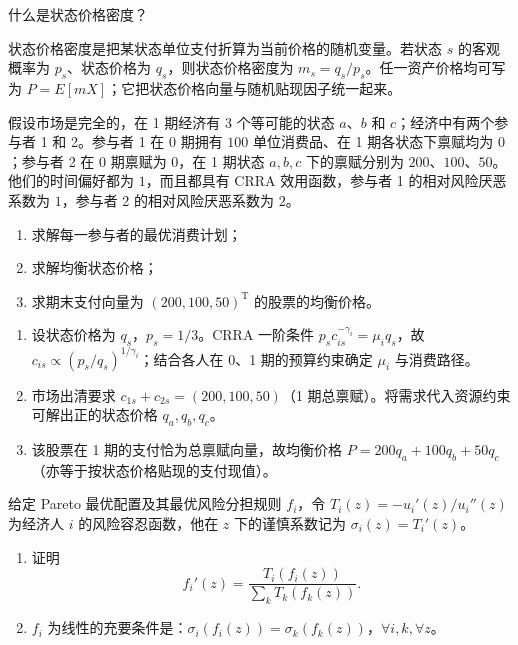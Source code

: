\begin{problem}
 什么是状态价格密度？
\end{problem}
\begin{solution}
状态价格密度是把某状态单位支付折算为当前价格的随机变量。若状态 $s$ 的客观概率为 $p_s$、状态价格为 $q_s$，则状态价格密度为 $m_s=q_s/p_s$。任一资产价格均可写为 $P=E[mX]$；它把状态价格向量与随机贴现因子统一起来。
\end{solution}
\begin{problem}
 假设市场是完全的，在 1 期经济有 $3$ 个等可能的状态 $a$、$b$ 和 $c$；经济中有两个参与者 1 和 2。参与者 1 在 0 期拥有 $100$ 单位消费品、在 1 期各状态下禀赋均为 $0$；参与者 2 在 0 期禀赋为 $0$，在 1 期状态 $a,b,c$ 下的禀赋分别为 $200$、$100$、$50$。他们的时间偏好都为 $1$，而且都具有 CRRA 效用函数，参与者 1 的相对风险厌恶系数为 $1$，参与者 2 的相对风险厌恶系数为 $2$。
\begin{enumerate}[label=(\alph*)]
    \item 求解每一参与者的最优消费计划；
    \item 求解均衡状态价格；
    \item 求期末支付向量为 $(200,100,50)^{\mathrm{T}}$ 的股票的均衡价格。
\end{enumerate}
\end{problem}
\begin{solution}
\begin{enumerate}[label=(\alph*)]
\item 设状态价格为 $q_s$，$p_s=1/3$。CRRA 一阶条件 $p_s c_{is}^{-\gamma_i}=\mu_i q_s$，故 $c_{is}\propto (p_s/q_s)^{1/\gamma_i}$；结合各人在 0、1 期的预算约束确定 $\mu_i$ 与消费路径。
\item 市场出清要求 $c_{1s}+c_{2s}=(200,100,50)$（1 期总禀赋）。将需求代入资源约束可解出正的状态价格 $q_a,q_b,q_c$。
\item 该股票在 1 期的支付恰为总禀赋向量，故均衡价格 $P=200q_a+100q_b+50q_c$（亦等于按状态价格贴现的支付现值）。
\end{enumerate}
\end{solution}
\begin{problem}
 给定 Pareto 最优配置及其最优风险分担规则 $f_i$，令 $T_i(z)=-u_i'(z)/u_i''(z)$ 为经济人 $i$ 的风险容忍函数，他在 $z$ 下的谨慎系数记为 $\sigma_i(z)=T_i'(z)$。
\begin{enumerate}[label=(\alph*)]
    \item 证明
    \[
        f_i'(z)=\frac{T_i(f_i(z))}{\sum_k T_k(f_k(z))}.
    \]
    \item $f_i$ 为线性的充要条件是：$\sigma_i(f_i(z))=\sigma_k(f_k(z))$，$\forall i,k,\forall z$。
\end{enumerate}
\end{problem}
